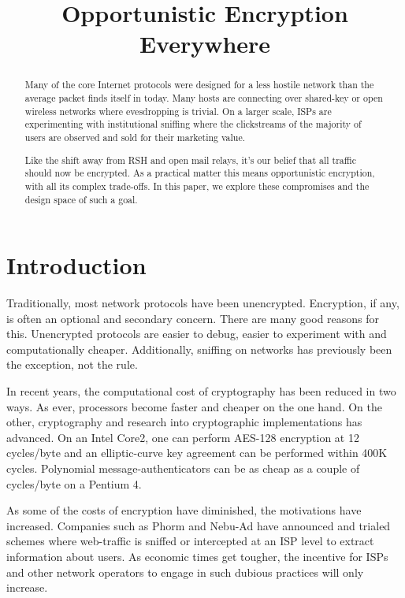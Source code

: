 \documentclass[conference]{IEEEtran}
\begin{document}
\title{Opportunistic Encryption Everywhere}

\author{
}

\maketitle

\begin{abstract}
Many of the core Internet protocols were designed for a less hostile network
than the average packet finds itself in today. Many hosts are connecting over
shared-key or open wireless networks where evesdropping is trivial. On a larger
scale, ISPs are experimenting with institutional sniffing where the
clickstreams of the majority of users are observed and sold for their marketing
value.

Like the shift away from RSH and open mail relays, it's our belief that all
traffic should now be encrypted. As a practical matter this means
opportunistic encryption, with all its complex trade-offs. In this paper, we
explore these compromises and the design space of such a goal.
\end{abstract}

\section{Introduction}

Traditionally, most network protocols have been unencrypted. Encryption, if
any, is often an optional and secondary concern. There are many good reasons
for this. Unencrypted protocols are easier to debug, easier to experiment with
and computationally cheaper. Additionally, sniffing on networks has previously
been the exception, not the rule.

In recent years, the computational cost of cryptography has been reduced in two
ways.  As ever, processors become faster and cheaper on the one hand. On the
other, cryptography and research into cryptographic implementations has
advanced. On an Intel Core2, one can perform AES-128 encryption at 12
cycles/byte\cite{aesspeed} and an elliptic-curve key agreement can be performed
within 400K cycles\cite{curve25519}. Polynomial message-authenticators can be as
cheap as a couple of cycles/byte on a Pentium 4\cite{umac}.

As some of the costs of encryption have diminished, the motivations have
increased. Companies such as Phorm and Nebu-Ad have announced and trialed
schemes where web-traffic is sniffed or intercepted at an ISP level to extract
information about users.  As economic times get tougher, the incentive for ISPs
and other network operators to engage in such dubious practices will only
increase.
\end{document}
